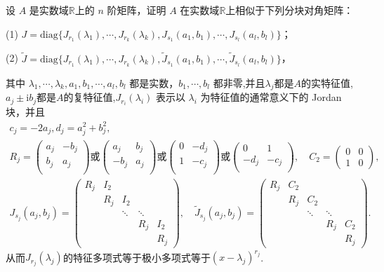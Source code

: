 \documentclass[../../main.tex]{subfiles}%
\begin{document}
\begin{theorem}[实数域上的广义Jordan标准型]\label{theorem:实数域上的广义Jordan标准型}
设 $A$ 是实数域$\mathbb{R}$上的 $n$ 阶矩阵，证明 $A$ 在实数域$\mathbb{R}$上相似于下列分块对角矩阵：

(1) $J = \mathrm{diag}\{J_{r_1}(\lambda_1),\cdots,J_{r_k}(\lambda_k),J_{s_1}(a_1,b_1),\cdots,J_{s_l}(a_l,b_l)\}$；

(2) $\widetilde{J} = \mathrm{diag}\{J_{r_1}(\lambda_1),\cdots,J_{r_k}(\lambda_k),\widetilde{J}_{s_1}(a_1,b_1),\cdots,\widetilde{J}_{s_l}(a_l,b_l)\}$，

其中 $\lambda_1,\cdots,\lambda_k,a_1,b_1,\cdots,a_l,b_l$ 都是实数，$b_1,\cdots,b_l$ 都非零,并且$\lambda_j$都是$A$的实特征值,$a_j\pm \mathrm{i}b_j$都是$A$的复特征值,$J_{r_i}(\lambda_i)$ 表示以 $\lambda_i$ 为特征值的通常意义下的 Jordan 块，并且
\begin{gather*}
c_j=-2a_j,d_j=a_j^2+b_j^2,
\\
R_j=\left( \begin{matrix}
a_j&		-b_j\\
b_j&		a_j\\
\end{matrix} \right) \text{或}\left( \begin{matrix}
a_j&		b_j\\
-b_j&		a_j\\
\end{matrix} \right) \text{或}\left( \begin{matrix}
0&		-d_j\\
1&		-c_j\\
\end{matrix} \right) \text{或}\left( \begin{matrix}
0&		1\\
-d_j&		-c_j\\
\end{matrix} \right) 
,\quad C_2 = \begin{pmatrix}0 & 0 \\ 1 & 0\end{pmatrix},
\\
J_{s_j}(a_j,b_j) = 
\begin{pmatrix}
R_j & I_2 & & \\
& R_j & I_2 & \\
& & \ddots & \ddots \\
& & & R_j & I_2 \\
& & & & R_j
\end{pmatrix}, \quad
\widetilde{J}_{s_j}(a_j,b_j) = 
\begin{pmatrix}
R_j & C_2 & & \\
& R_j & C_2 & \\
& & \ddots & \ddots \\
& & & R_j & C_2 \\
& & & & R_j
\end{pmatrix}.
\end{gather*}
从而$J_{r_j}(\lambda_j)$的特征多项式等于极小多项式等于$(x-\lambda_j)^{r_j}$.


\end{theorem}
\end{document}
